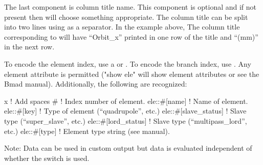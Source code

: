 {{{{{{{{\begin{description}
The last component is column title name. This component is optional and if not present then \tao
will choose something appropriate. The column title can be split into two lines using  as a
separator.  In the example above, The column title corresponding to  will have
``Orbit_x'' printed in one row of the title and ``(mm)'' in the next row.

To encode the element index, use a \vn{\#} or . To encode the branch index, use
. Any element attribute is permitted ("show ele" will show element attributes or see
the Bmad manual). Additionally, the following are recognized:
\begin{example}
  x                           ! Add spaces
  #                           ! Index number of element.
  ele::#[name]                ! Name of element.
  ele::#[key]                 ! Type of element (``quadrupole'', etc.)
  ele::#[slave_status]        ! Slave type (``super_slave'', etc.)
  ele::#[lord_status]         ! Slave type (``multipass_lord'', etc.)
  ele::#[type]                ! Element type string (see \bmad manual).
\end{example}

Note: Data can be used in custom output but data is evaluated independent of whether the
 switch is used.


\end{description}}}}}}}}}
